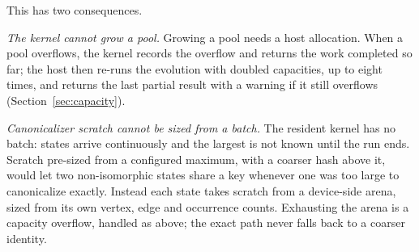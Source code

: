 This has two consequences.

\emph{The kernel cannot grow a pool.} Growing a pool needs a host allocation. When a pool
overflows, the kernel records the overflow and returns the work completed so far; the host then
re-runs the evolution with doubled capacities, up to eight times, and returns the last partial
result with a warning if it still overflows (Section~\ref{sec:capacity}).

\emph{Canonicalizer scratch cannot be sized from a batch.} The resident kernel has no batch: states
arrive continuously and the largest is not known until the run ends. Scratch pre-sized from a
configured maximum, with a coarser hash above it, would let two non-isomorphic states share a key
whenever one was too large to canonicalize exactly. Instead each state takes scratch from a
device-side arena, sized from its own vertex, edge and occurrence counts. Exhausting the arena is a
capacity overflow, handled as above; the exact path never falls back to a coarser identity.
